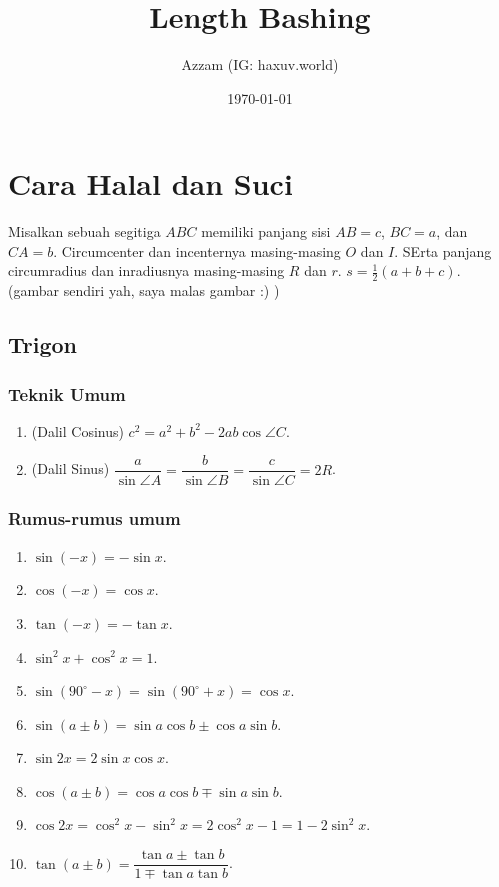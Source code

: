 \documentclass[11pt]{scrartcl}
\title{Length Bashing}
\author{Azzam (IG: haxuv.world)}
\date{\today}
\begin{document}
\maketitle

\section{Cara Halal dan Suci}
Misalkan sebuah segitiga $ABC$ memiliki panjang sisi $AB=c$, $BC=a$, dan $CA=b$. Circumcenter dan incenternya masing-masing $O$ dan $I$. SErta panjang circumradius dan inradiusnya masing-masing $R$ dan $r$. $s=\frac{1}{2}(a+b+c)$. (gambar sendiri yah, saya malas gambar :) )

\subsection{Trigon}
\subsubsection{Teknik Umum}
\begin{enumerate}
    \item (Dalil Cosinus) $c^2=a^2+b^2-2ab \cos \angle C$.
    \item (Dalil Sinus) $\dfrac{a}{\sin \angle A}=\dfrac{b}{\sin \angle B}=\dfrac{c}{\sin \angle C}=2R$.
\end{enumerate}

\subsubsection{Rumus-rumus umum}
\begin{enumerate}
    \item $\sin (-x) = -\sin x$.
    \item $\cos (-x) = \cos x$.
    \item $\tan(-x) = -\tan x$.
    \item $\sin^2 x + \cos^2 x = 1$.
    \item $\sin(90^\circ-x)=\sin(90^\circ+x)=\cos x$.
    \item $\sin(a \pm b) = \sin a \cos b \pm \cos a \sin b$.
    \item $\sin 2x = 2\sin x \cos x$.
    \item $\cos(a \pm b) = \cos a \cos b \mp \sin a \sin b$.
    \item $\cos 2x = \cos^2 x - \sin^2 x = 2\cos^2 x -1 = 1-2\sin^2 x$.
    \item $\tan(a \pm b) = \dfrac{\tan a \pm \tan b}{1 \mp \tan a \tan b}$.
\end{enumerate}
\end{document}
